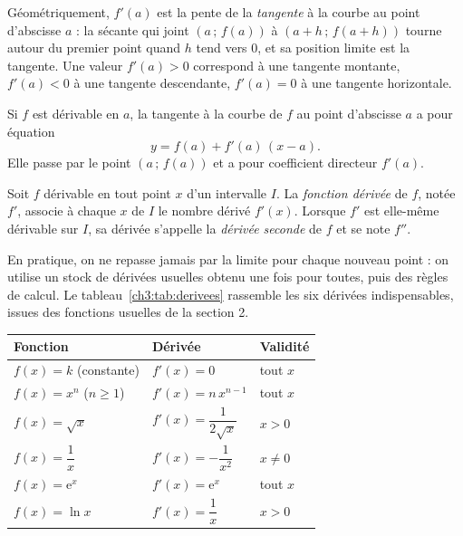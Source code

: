 Géométriquement, $f'(a)$ est la pente de la \emph{tangente} à la courbe au point d'abscisse $a$ : la sécante qui joint $(a\,;\,f(a))$ à $(a+h\,;\,f(a+h))$ tourne autour du premier point quand $h$ tend vers $0$, et sa position limite est la tangente. Une valeur $f'(a) > 0$ correspond à une tangente montante, $f'(a) < 0$ à une tangente descendante, $f'(a) = 0$ à une tangente horizontale.

\begin{propriete}
Si $f$ est dérivable en $a$, la tangente à la courbe de $f$ au point d'abscisse $a$ a pour équation
\[
y = f(a) + f'(a)\,(x - a).
\]
Elle passe par le point $(a\,;\,f(a))$ et a pour coefficient directeur $f'(a)$.
\end{propriete}

\begin{definition}
Soit $f$ dérivable en tout point $x$ d'un intervalle $I$. La \emph{fonction dérivée} de $f$, notée $f'$, associe à chaque $x$ de $I$ le nombre dérivé $f'(x)$. Lorsque $f'$ est elle-même dérivable sur $I$, sa dérivée s'appelle la \emph{dérivée seconde} de $f$ et se note $f''$.
\end{definition}

En pratique, on ne repasse jamais par la limite pour chaque nouveau point : on utilise un stock de dérivées usuelles obtenu une fois pour toutes, puis des règles de calcul. Le tableau~\ref{ch3:tab:derivees} rassemble les six dérivées indispensables, issues des fonctions usuelles de la section 2.

\begin{center}
\label{ch3:tab:derivees}
\begin{tabular}{L{4.9cm}C{4.0cm}L{4.0cm}}
\toprule
\textbf{Fonction} & \textbf{Dérivée} & \textbf{Validité} \\
\midrule
$f(x) = k$ (constante) & $f'(x) = 0$ & tout $x$ \\
$f(x) = x^{n}$ ($n \geq 1$) & $f'(x) = n\,x^{n-1}$ & tout $x$ \\
$f(x) = \sqrt{x}$ & $f'(x) = \dfrac{1}{2\sqrt{x}}$ & $x > 0$ \\
$f(x) = \dfrac{1}{x}$ & $f'(x) = -\dfrac{1}{x^{2}}$ & $x \neq 0$ \\
$f(x) = \mathrm{e}^{x}$ & $f'(x) = \mathrm{e}^{x}$ & tout $x$ \\
$f(x) = \ln x$ & $f'(x) = \dfrac{1}{x}$ & $x > 0$ \\
\bottomrule
\end{tabular}
\end{center}

